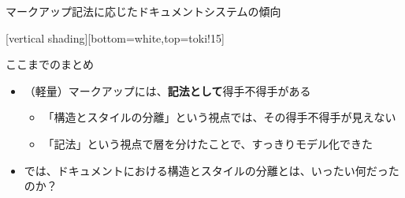 \documentclass[14pt,dvipdfmx,uplatex]{beamer}
\begin{document}
{%
\begin{frame}[t]{\inhibitglue マークアップ記法に応じたドキュメントシステムの傾向 }
  \sffamily
  \begin{center}
  \end{center}
\end{frame}
}

[vertical shading][bottom=white,top=toki!15]

\begin{frame}[t]{\inhibitglue ここまでのまとめ}
  \sffamily
  \begin{itemize}
    \item \leavevmode\inhibitglue （軽量）マークアップには、\textbf{記法として}得手不得手がある
    \begin{itemize}
      \item \leavevmode\inhibitglue 「構造とスタイルの分離」という視点では、その得手不得手が見えない
      \item \leavevmode\inhibitglue 「記法」という視点で層を分けたことで、すっきりモデル化できた
    \end{itemize}\pause
    \item では、ドキュメントにおける構造とスタイルの分離とは、いったい何だったのか？
  \end{itemize}
\end{frame}
\end{document}
